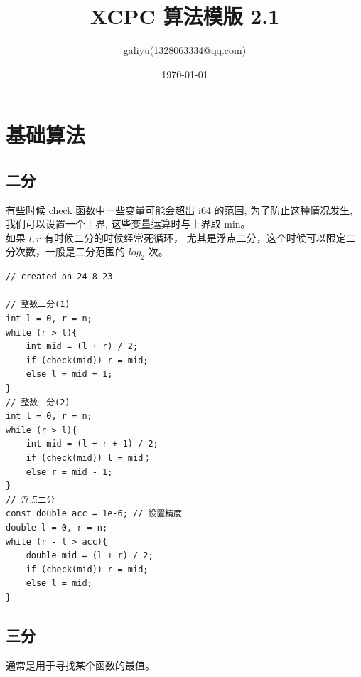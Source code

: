 \documentclass[a4paper,12pt]{article}
\title{XCPC 算法模版 2.1}
\author{galiyu(1328063334@qq.com)}
\date{\today}
\begin{document}
\maketitle
\thispagestyle{empty}
\clearpage
\newpage

\pagestyle{fancy}
\fancyhead{}
\fancyfoot{}
\tableofcontents
\newpage

\fancyhead[R]{\thepage}

\section{基础算法}
\subsection{二分}

\noindent 有些时候 check 函数中一些变量可能会超出 i64 的范围, 为了防止这种情况发生, 
我们可以设置一个上界, 这些变量运算时与上界取 min。\\

\noindent 如果 \(l, r\) 有时候二分的时候经常死循环，
尤其是浮点二分，这个时候可以限定二分次数，一般是二分范围的 \(log_2\) 次。 

\begin{lstlisting}
// created on 24-8-23

// 整数二分(1)
int l = 0, r = n;
while (r > l){
    int mid = (l + r) / 2;
    if (check(mid)) r = mid;
    else l = mid + 1;
}
// 整数二分(2)
int l = 0, r = n;
while (r > l){
    int mid = (l + r + 1) / 2;
    if (check(mid)) l = mid；
    else r = mid - 1;
}
// 浮点二分
const double acc = 1e-6; // 设置精度
double l = 0, r = n;
while (r - l > acc){
    double mid = (l + r) / 2;
    if (check(mid)) r = mid;
    else l = mid;
}
\end{lstlisting}

\subsection{三分}

\noindent 通常是用于寻找某个函数的最值。
\end{document}
